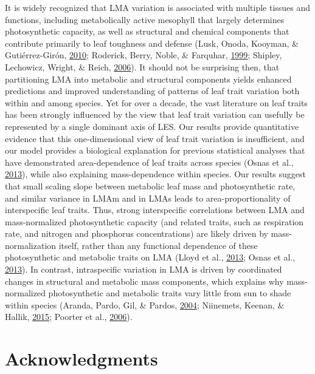 \documentclass[12pt,]{article}
\theoremstyle{definition}
\theoremstyle{definition}
\theoremstyle{definition}
\theoremstyle{remark}
\begin{document}
It is widely recognized that LMA variation is associated with multiple
tissues and functions, including metabolically active mesophyll that
largely determines photosynthetic capacity, as well as structural and
chemical components that contribute primarily to leaf toughness and
defense (Lusk, Onoda, Kooyman, \& Gutiérrez-Girón,
\protect\hyperlink{ref-Lusk2010}{2010}; Roderick, Berry, Noble, \&
Farquhar, \protect\hyperlink{ref-Roderick1999}{1999}; Shipley,
Lechowicz, Wright, \& Reich, \protect\hyperlink{ref-Shipley2006}{2006}).
It should not be surprising then, that partitioning LMA into metabolic
and structural components yields enhanced predictions and improved
understanding of patterns of leaf trait variation both within and among
species. Yet for over a decade, the vast literature on leaf traits has
been strongly influenced by the view that leaf trait variation can
usefully be represented by a single dominant axis of LES. Our results
provide quantitative evidence that this one-dimensional view of leaf
trait variation is insufficient, and our model provides a biological
explanation for previous statistical analyses that have demonstrated
area-dependence of leaf traits across species (Osnas et al.,
\protect\hyperlink{ref-Osnas2013}{2013}), while also explaining
mass-dependence within species. Our results suggest that small scaling
slope between metabolic leaf mass and photosynthetic rate, and similar
variance in LMAm and in LMAs leads to area-proportionality of
interspecific leaf traits. Thus, strong interspecific correlations
between LMA and mass-normalized photosynthetic capacity (and related
traits, such as respiration rate, and nitrogen and phosphorus
concentrations) are likely driven by mass-normalization itself, rather
than any functional dependence of these photosynthetic and metabolic
traits on LMA (Lloyd et al., \protect\hyperlink{ref-Lloyd2013}{2013};
Osnas et al., \protect\hyperlink{ref-Osnas2013}{2013}). In contrast,
intraspecific variation in LMA is driven by coordinated changes in
structural and metabolic mass components, which explains why
mass-normalized photosynthetic and metabolic traits vary little from sun
to shade within species (Aranda, Pardo, Gil, \& Pardos,
\protect\hyperlink{ref-Aranda2004}{2004}; Niinemets, Keenan, \& Hallik,
\protect\hyperlink{ref-Niinemets2015}{2015}; Poorter et al.,
\protect\hyperlink{ref-Poorter2006b}{2006}).

\hypertarget{acknowledgments}{%
\section{Acknowledgments}\label{acknowledgments}}
\end{document}
